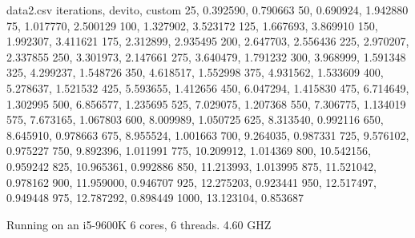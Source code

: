 \documentclass{article}
\begin{document}
\begin{filecontents*}{data2.csv}
	iterations, devito, custom
	25, 0.392590, 0.790663
	50, 0.690924, 1.942880
	75, 1.017770, 2.500129
	100, 1.327902, 3.523172
	125, 1.667693, 3.869910
	150, 1.992307, 3.411621
	175, 2.312899, 2.935495
	200, 2.647703, 2.556436
	225, 2.970207, 2.337855
	250, 3.301973, 2.147661
	275, 3.640479, 1.791232
	300, 3.968999, 1.591348
	325, 4.299237, 1.548726
	350, 4.618517, 1.552998
	375, 4.931562, 1.533609
	400, 5.278637, 1.521532
	425, 5.593655, 1.412656
	450, 6.047294, 1.415830
	475, 6.714649, 1.302995
	500, 6.856577, 1.235695
	525, 7.029075, 1.207368
	550, 7.306775, 1.134019
	575, 7.673165, 1.067803
	600, 8.009989, 1.050725
	625, 8.313540, 0.992116
	650, 8.645910, 0.978663
	675, 8.955524, 1.001663
	700, 9.264035, 0.987331
	725, 9.576102, 0.975227
	750, 9.892396, 1.011991
	775, 10.209912, 1.014369
	800, 10.542156, 0.959242
	825, 10.965361, 0.992886
	850, 11.213993, 1.013995
	875, 11.521042, 0.978162
	900, 11.959000, 0.946707
	925, 12.275203, 0.923441
	950, 12.517497, 0.949448
	975, 12.787292, 0.898449
	1000, 13.123104, 0.853687
\end{filecontents*}
Running on an i5-9600K 6 cores, 6 threads. 4.60 GHZ \\ \\
\end{document}
